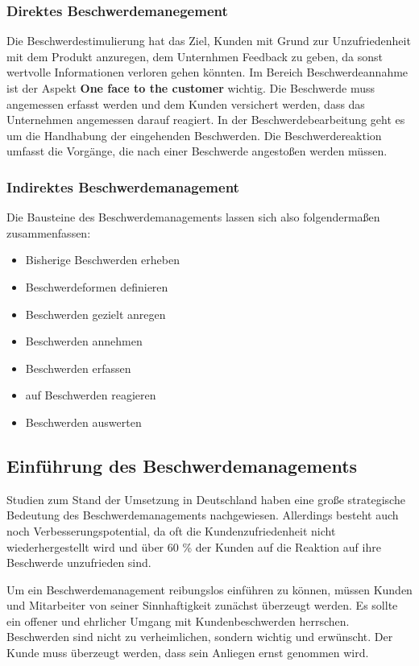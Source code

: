 \documentclass[a4paper,12pt]{article}
\begin{document}
	\subsubsection{Direktes Beschwerdemanegement}
	Die Beschwerdestimulierung hat das Ziel, Kunden mit Grund zur Unzufriedenheit mit dem Produkt anzuregen, dem Unternhmen Feedback zu geben, da sonst wertvolle Informationen verloren gehen könnten. Im Bereich Beschwerdeannahme ist der Aspekt \textbf{One face to the customer} wichtig. Die Beschwerde muss angemessen erfasst werden und dem Kunden versichert werden, dass das Unternehmen angemessen darauf reagiert. In der Beschwerdebearbeitung geht es um die Handhabung der eingehenden Beschwerden. Die Beschwerdereaktion umfasst die Vorgänge, die nach einer Beschwerde angestoßen werden müssen.  {\cite{.02.04.2016}}
	\subsubsection{Indirektes Beschwerdemanagement}
	Die Bausteine des Beschwerdemanagements lassen sich also folgendermaßen zusammenfassen:
	\begin{itemize}
		\item Bisherige Beschwerden erheben
		\item Beschwerdeformen definieren
		\item Beschwerden gezielt anregen
		\item Beschwerden annehmen
		\item Beschwerden erfassen
		\item auf Beschwerden reagieren
		\item Beschwerden auswerten
	\end{itemize}
	\subsection{Einführung des Beschwerdemanagements}
	Studien zum Stand der Umsetzung in Deutschland haben eine große strategische Bedeutung des Beschwerdemanagements nachgewiesen. Allerdings besteht auch noch Verbesserungspotential, da oft die Kundenzufriedenheit nicht wiederhergestellt wird und über 60 \% der Kunden auf die Reaktion auf ihre Beschwerde unzufrieden sind.  {\cite{.02.04.2016}}
	
	Um ein Beschwerdemanagement reibungslos einführen zu können, müssen Kunden und Mitarbeiter von seiner Sinnhaftigkeit zunächst überzeugt werden. Es sollte ein offener und ehrlicher Umgang mit Kundenbeschwerden herrschen. Beschwerden sind nicht zu verheimlichen, sondern wichtig und erwünscht. Der Kunde muss überzeugt werden, dass sein Anliegen ernst genommen wird. \cite{Franke.}
	\nocite{Wikipedia.02.03.2016}
	\nocite{.02.04.2016}
	\nocite{.02.04.2016b}
	\nocite{Franke.}
	\newpage
	\printbibliography
\end{document}
